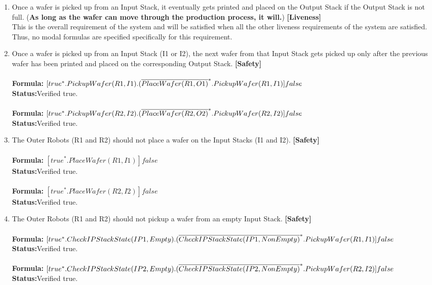 \documentclass[a4paper,12pt]{article}
\begin{document}
	\begin{enumerate}
		\item Once a wafer is picked up from an Input Stack, it eventually gets printed and placed on the Output Stack if the Output Stack is not full. (\textbf{As long as the wafer can move through the production process, it will.}) \textbf{[Liveness]}
		\\
		This is the overall requirement of the system and will be satisfied when all the other liveness requirements of the system are satisfied. Thus, no modal formulas are specified specifically for this requirement.
		
		\item Once a wafer is picked up from an Input Stack (I1 or I2), the next wafer from that Input Stack gets picked up only after the previous wafer has been printed and placed on the corresponding Output Stack. \textbf{[Safety]}
		\\
		\\\textbf{Formula:} $[true^*.PickupWafer(R1, I1) \\.(\overline{PlaceWafer(R1,O1)}^*.PickupWafer(R1,I1)]false$ \\\textbf{Status:}Verified true.
		\\
		\\\textbf{Formula:} $[true^*.PickupWafer(R2, I2)
		\\.(\overline{PlaceWafer(R2,O2)}^*.PickupWafer(R2,I2)]false$ \\\textbf{Status:}Verified true.
		
		\item The Outer Robots (R1 and R2) should not place a wafer on the Input Stacks (I1 and I2). \textbf{[Safety]}
		\\
		\\\textbf{Formula:} $[true^*. PlaceWafer(R1,I1)]false $ \\\textbf{Status:}Verified true.
		\\
		\\\textbf{Formula:} $[true^*. PlaceWafer(R2,I2)]false $ \\\textbf{Status:}Verified true.
		
		\item The Outer Robots (R1 and R2) should not pickup a wafer from an empty Input Stack. \textbf{[Safety]}
		\\
		\\\textbf{Formula:} $[true^*.  CheckIPStackState(IP1, Empty).
		\\(\overline{CheckIPStackState(IP1, NonEmpty)}^*.PickupWafer(R1, I1)]false$ \\\textbf{Status:}Verified true.
		\\
		\\\textbf{Formula:} $[true^*.  CheckIPStackState(IP2, Empty).
		\\(\overline{CheckIPStackState(IP2, NonEmpty)}^*.PickupWafer(R2, I2)]false$ \\\textbf{Status:}Verified true.
		

\end{enumerate}
\end{document}
